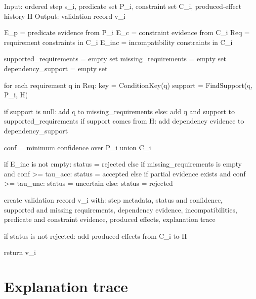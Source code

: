 {\color{red}
\begin{listing*}
\begin{Code}
Input: ordered step s_i, predicate set P_i, constraint set C_i,
       produced-effect history H
Output: validation record v_i

E_p = predicate evidence from P_i
E_c = constraint evidence from C_i
Req = requirement constraints in C_i
E_inc = incompatibility constraints in C_i

supported_requirements = empty set
missing_requirements = empty set
dependency_support = empty set

for each requirement q in Req:
    key = ConditionKey(q)
    support = FindSupport(q, P_i, H)

    if support is null:
        add q to missing_requirements
    else:
        add q and support to supported_requirements
        if support comes from H:
            add dependency evidence to dependency_support

conf = minimum confidence over P_i union C_i

if E_inc is not empty:
    status = rejected
else if missing_requirements is empty and conf >= tau_acc:
    status = accepted
else if partial evidence exists and conf >= tau_unc:
    status = uncertain
else:
    status = rejected

create validation record v_i with:
    step metadata,
    status and confidence,
    supported and missing requirements,
    dependency evidence,
    incompatibilities,
    predicate and constraint evidence,
    produced effects,
    explanation trace

if status is not rejected:
    add produced effects from C_i to H

return v_i
\end{Code}
\caption{Algorithm for step validation in Layer 4. Each step is accepted, rejected, or marked uncertain by combining same-step evidence, incompatibility constraints, and requirements supported by previous produced effects.}
\label{lst:alg_step_validation}
\end{listing*}
}



\section{Explanation trace}
\label{sec:explanation-trace}

